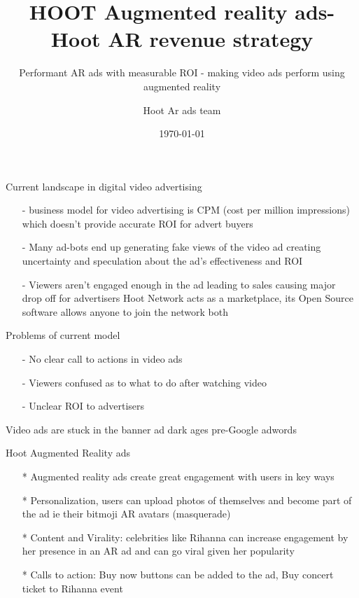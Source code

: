 \documentclass[10pt]{beamer}
\title{HOOT Augmented reality ads- Hoot AR revenue strategy}
\subtitle{Performant AR ads with measurable ROI  - making video ads perform using augmented reality}
\date{\today}
\author{Hoot Ar ads team}
\institute{Hoot Live inc., a Delaware C-corp}
\begin{document}
\maketitle



\begin{frame}[fragile]{Current landscape in digital video advertising }

\begin{itemize}
\item[-]business model for video advertising is CPM (cost per million impressions) which doesn’t provide accurate ROI for advert buyers
  
\item[-]Many ad-bots end up generating fake views of the video ad creating uncertainty and speculation about the ad’s effectiveness and ROI
\item[-]Viewers aren’t engaged enough in the ad leading to sales causing major drop off for advertisers
Hoot Network acts as a marketplace, its Open Source software allows anyone to join the network both 
\end{itemize}

\end{frame}
\begin{frame}[t]{Problems of current model}
\begin{itemize}
\item[-]No clear call to actions in video ads
\pause
\item[-]Viewers confused as to what to do after watching video
\pause
\item[-]Unclear ROI to advertisers
\end{itemize}
\pause
Video ads are stuck in the banner ad dark ages pre-Google adwords 

\end{frame}
\begin{frame}[t]{Hoot Augmented Reality ads }
\begin{itemize}
\item[*]Augmented reality ads create great engagement with users in key ways
\pause
\item[*]Personalization, users can upload photos of themselves and become part of the ad ie their  bitmoji AR avatars (masquerade) 
\pause
\item[*]Content and Virality: celebrities like Rihanna can increase engagement by her presence in an AR ad and can go viral given her popularity
\pause
\item[*]Calls to action: Buy now buttons can be added to the ad, Buy concert ticket to Rihanna event
\pause
\end{itemize}
\end{frame}
\end{document}
